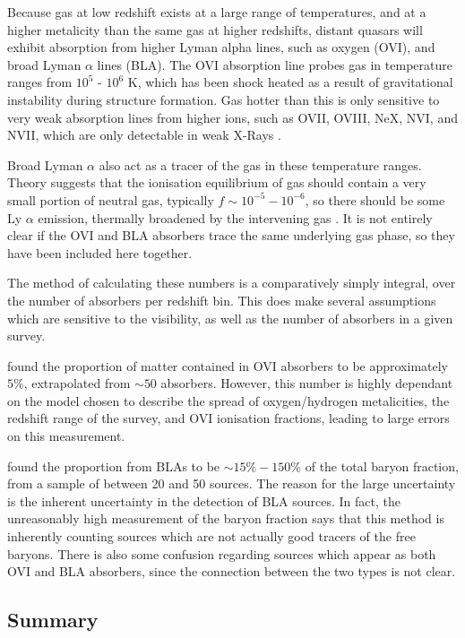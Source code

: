 Because gas at low redshift exists at a large range of temperatures, and at a higher metalicity than the same gas at higher redshifts, distant quasars will exhibit absorption from higher Lyman alpha lines, such as oxygen (OVI), and broad Lyman $\alpha$ lines (BLA). The OVI absorption line probes gas in temperature ranges from $10^5$ - $10^6$ K, which has been shock heated as a result of gravitational instability during structure formation. Gas hotter than this is only sensitive to very weak absorption lines from higher ions, such as OVII, OVIII, NeX, NVI, and NVII, which are only detectable in weak X-Rays \citep{2005ApJ...624..555D}. 
\par Broad Lyman $\alpha$ also act as a tracer of the gas in these temperature ranges. Theory suggests that the ionisation equilibrium of gas should contain a very small portion of neutral gas, typically $f \sim 10^{-5} - 10^{-6}$, so there should be some Ly $\alpha$ emission, thermally broadened by the intervening gas \citep{2006A&A...445..827R}. It is not entirely clear if the OVI and BLA absorbers trace the same underlying gas phase, so they have been included here together. 
\par The method of calculating these numbers is a comparatively simply integral, over the number of absorbers per redshift bin. This does make several assumptions which are sensitive to the visibility, as well as the number of absorbers in a given survey. \par \cite{2005ApJ...624..555D} found the proportion of matter contained in OVI absorbers to be approximately $5\%$, extrapolated from $\sim 50$ absorbers. However, this number is highly dependant on the model chosen to describe the spread of oxygen/hydrogen metalicities, the redshift range of the survey, and OVI ionisation fractions, leading to large errors on this measurement. 
\par \cite{2006A&A...445..827R} found the proportion from BLAs to be $\sim 15 \% - 150 \%$ of the total baryon fraction, from a sample of between 20 and 50 sources. The reason for the large uncertainty is the inherent uncertainty in the detection of BLA sources. In fact, the unreasonably high measurement of the baryon fraction says that this method is inherently counting sources which are not actually good tracers of the free baryons. There is also some confusion regarding sources which appear as both OVI and BLA absorbers, since the connection between the two types is not clear. 

\subsection{Summary}

